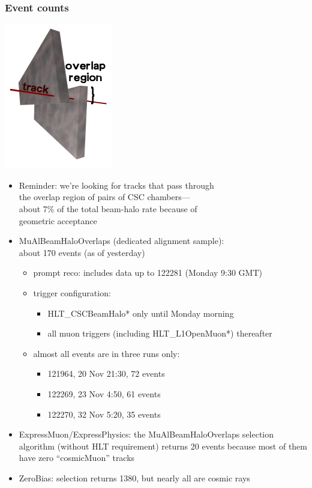 \documentclass[compress]{beamer}
\begin{document}
\begin{frame}
\frametitle{Event counts}

\vspace{0.5 cm}
\hfill \includegraphics[height=2.5 cm]{overlaps.png}

\vspace{-3 cm}
\begin{itemize}
\item Reminder: we're looking for tracks that pass through \\ the overlap region of pairs of CSC chambers--- \\ about 7\% of the total beam-halo rate because of \\ geometric acceptance

\item MuAlBeamHaloOverlaps (dedicated alignment sample): \\ about 170 events (as of yesterday)
\begin{itemize}
\item prompt reco: includes data up to 122281 {\scriptsize (Monday 9:30 GMT)}
\item trigger configuration:
\begin{itemize}
\item HLT\_CSCBeamHalo* only until Monday morning
\item all muon triggers {\scriptsize (including HLT\_L1OpenMuon*)} thereafter
\end{itemize}
\item almost all events are in three runs only:
\begin{itemize}
\item 121964, 20 Nov 21:30, 72 events
\item 122269, 23 Nov  4:50, 61 events
\item 122270, 32 Nov  5:20, 35 events
\end{itemize}
\end{itemize}

\item ExpressMuon/ExpressPhysics: the MuAlBeamHaloOverlaps selection algorithm {\scriptsize (without HLT requirement)} returns 20 events because most of them have zero ``cosmicMuon'' tracks

\item ZeroBias: selection returns 1380, but nearly all are cosmic rays
\end{itemize}
\end{frame}
\end{document}
